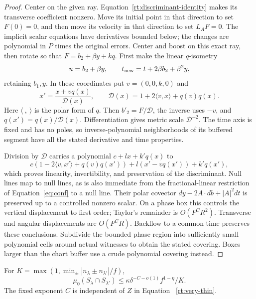 \begin{proof}
Center on the given ray.  Equation~\eqref{rt:discriminant-identity} makes
its transverse coefficient nonzero.  Move its initial point in that
direction to set $F(0)=0$, and then move its velocity in that direction
to set $L_AF=0$.  The implicit scalar equations have derivatives bounded
below; the changes are polynomial in $P$ times the original errors.
Center and boost on this exact ray, then rotate so that
$F=b_2+\beta y+kq$.
First make the linear $q$-isometry
\[
 u=b_2+\beta y,\qquad t_{\rm new}=t+2\beta b_2+\beta^2y,
\]
retaining $b_1,y$.  In these coordinates put $v=(0,0,k,0)$ and
\begin{equation}
 x'=\frac{x+v q(x)}{\mathcal D(x)},\qquad
 \mathcal D(x)=1+2\langle v,x\rangle+q(v)q(x).
 \tag{conf}\label{eq:conf}
\end{equation}
Here $\langle\ ,\ \rangle$ is the polar form of $q$.
Then $b'_2=F/\mathcal D$, the inverse uses $-v$, and
$q(x')=q(x)/\mathcal D(x)$.  Differentiation gives metric scale
$\mathcal D^{-2}$.  The time axis is fixed and has no poles, so
inverse-polynomial neighborhoods of its buffered segment have all the
stated derivative and time properties.

Division by $\mathcal D$ carries a polynomial $c+lx+k'q(x)$ to
\[
 c(1-2\langle v,x'\rangle+q(v)q(x'))
       +l(x'-vq(x'))+k'q(x'),
\]
which proves linearity, invertibility, and preservation of the
discriminant.  Null lines map to null lines, as is also immediate from
the fractional-linear restriction of Equation~\eqref{eq:conf} to a
null line.  Their polar covector
$dy-2A\cdot db+|A|^2dt$ is preserved up to a controlled nonzero scalar.
On a phase box this controls the vertical displacement to first order;
Taylor's remainder is $O(P^CR^2)$.  Transverse and angular displacements
are $O(P^CR)$.  Backflow to a common time preserves these conclusions.
Subdivide the bounded phase region into sufficiently small polynomial
cells around actual witnesses to obtain the stated covering.  Boxes
larger than the chart buffer use a crude polynomial covering instead.
\end{proof}

\begin{lemma}\label{rt:thin-overlap}
For
$K=\max(1,\min_\pm|n_\lambda\pm n_{\lambda'}|/f)$,
\begin{equation}
 \mu_0(S_\lambda\cap S_{\lambda'})
 \le\kappa\delta^{-C-o(1)}f^{1-\eta}/K.
 \tag{CI}\label{eq:CI}
\end{equation}
The fixed exponent $C$ is independent of $Z$ in Equation~
\eqref{rt:very-thin}.
\end{lemma}

